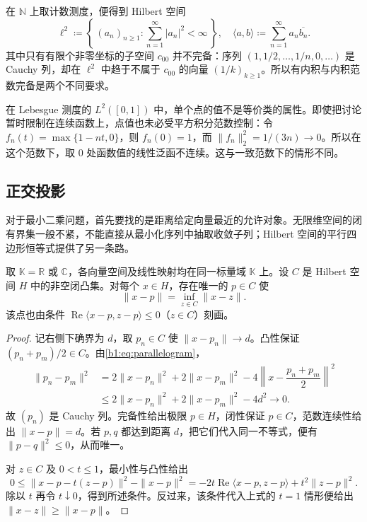 在 \(\mathbb N\) 上取计数测度，便得到 Hilbert 空间
\[
\ell^2\coloneqq\left\{\,(a_n)_{n\geq1}:\sum_{n=1}^{\infty}|a_n|^2<\infty\,\right\},
\quad
\langle a,b\rangle\coloneqq\sum_{n=1}^{\infty}a_n\overline{b_n}.
\]
其中只有有限个非零坐标的子空间 \(c_{00}\) 并不完备：序列 \((1,1/2,\ldots,1/n,0,\ldots)\) 是 Cauchy 列，却在 \(\ell^2\) 中趋于不属于 \(c_{00}\) 的向量 \((1/k)_{k\geq1}\)。所以有内积与内积范数完备是两个不同要求。

\ProseParagraphBreak

在 Lebesgue 测度的 \(L^2([0,1])\) 中，单个点的值不是等价类的属性。即使把讨论暂时限制在连续函数上，点值也未必受平方积分范数控制：令 \(f_n(t)=\max\{1-nt,0\}\)，则 \(f_n(0)=1\)，而 \(\|f_n\|_2^2=1/(3n)\to0\)。所以在这个范数下，取 \(0\) 处函数值的线性泛函不连续。这与一致范数下的情形不同。

\subsection{正交投影}
\label{b1:subsec:080402}

对于最小二乘问题，首先要找的是距离给定向量最近的允许对象。无限维空间的闭有界集一般不紧，不能直接从最小化序列中抽取收敛子列；Hilbert 空间的平行四边形恒等式提供了另一条路。

\begin{theorem}[闭凸集上的最小点]\label{b1:thm:hilbert-convex-minimum}
取 \(\mathbb K=\mathbb R\) 或 \(\mathbb C\)，各向量空间及线性映射均在同一标量域 \(\mathbb K\) 上。设 \(C\) 是 Hilbert 空间 \(H\) 中的非空闭凸集。对每个 \(x\in H\)，存在唯一的 \(p\in C\) 使
\[
\|x-p\|=\inf_{z\in C}\|x-z\|.
\]
该点也由条件 \(\operatorname{Re}\langle x-p,z-p\rangle\leq0\)（\(z\in C\)）刻画。
\end{theorem}
\begin{proof}
记右侧下确界为 \(d\)，取 \(p_n\in C\) 使 \(\|x-p_n\|\to d\)。凸性保证 \((p_n+p_m)/2\in C\)。由\eqref{b1:eq:parallelogram}，
\[
\begin{aligned}
\|p_n-p_m\|^2
&=2\|x-p_n\|^2+2\|x-p_m\|^2
-4\left\|x-\dfrac{p_n+p_m}{2}\right\|^2\\
&\leq2\|x-p_n\|^2+2\|x-p_m\|^2-4d^2\longrightarrow0.
\end{aligned}
\]
故 \((p_n)\) 是 Cauchy 列。完备性给出极限 \(p\in H\)，闭性保证 \(p\in C\)，范数连续性给出 \(\|x-p\|=d\)。若 \(p,q\) 都达到距离 \(d\)，把它们代入同一不等式，便有 \(\|p-q\|^2\leq0\)，从而唯一。

对 \(z\in C\) 及 \(0<t\leq1\)，最小性与凸性给出
\[
0\leq\|x-p-t(z-p)\|^2-\|x-p\|^2
=-2t\operatorname{Re}\langle x-p,z-p\rangle+t^2\|z-p\|^2.
\]
除以 \(t\) 再令 \(t\downarrow0\)，得到所述条件。反过来，该条件代入上式的 \(t=1\) 情形便给出 \(\|x-z\|\geq\|x-p\|\)。
\end{proof}

